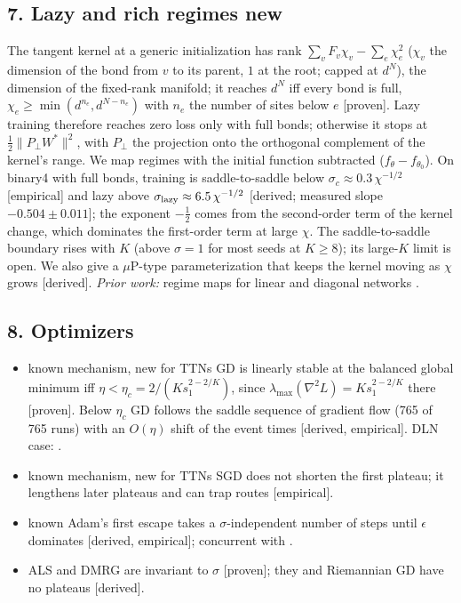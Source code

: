 \documentclass[11pt]{article}
\newcommand{\NEW}{\colorbox{ForestGreen!22}{\textsf{\small new}}}
\newcommand{\TTN}{\colorbox{Goldenrod!30}{\textsf{\small known mechanism, new for TTNs}}}
\newcommand{\KNOWN}{\colorbox{gray!22}{\textsf{\small known}}}
\newcommand{\ev}[1]{\textsf{\small[#1]}}
\begin{document}
\subsection*{7. Lazy and rich regimes \hfill\NEW}
The tangent kernel at a generic initialization has rank
$\sum_vF_v\chi_v-\sum_e\chi_e^2$ ($\chi_v$ the dimension of the bond from $v$ to its parent, $1$ at the root; capped at $d^N$), the dimension of the fixed-rank manifold; it reaches $d^N$
iff every bond is full, $\chi_e\ge\min(d^{n_e},d^{N-n_e})$ with $n_e$ the number of sites below $e$
\ev{proven}. Lazy training therefore reaches zero loss only with full bonds; otherwise it stops at
$\tfrac12\lVert P_\perp W^*\rVert^2$, with $P_\perp$ the projection onto the orthogonal complement of the kernel's range. We map regimes with the initial function subtracted
($f_\theta-f_{\theta_0}$). On binary4 with full bonds, training is saddle-to-saddle below
$\sigma_c\approx0.3\,\chi^{-1/2}$ \ev{empirical} and lazy above $\sigma_{\rm lazy}\approx6.5\,\chi^{-1/2}$
\ev{derived; measured slope $-0.504\pm0.011$}; the exponent $-\tfrac12$ comes from the second-order term of the kernel change, which dominates the
first-order term at large $\chi$. The saddle-to-saddle boundary rises with $K$ (above $\sigma=1$ for most seeds at $K\ge8$); its
large-$K$ limit is open. We also give a $\mu$P-type parameterization that keeps the kernel moving as $\chi$
grows \ev{derived}.
\emph{Prior work:} regime maps for linear and diagonal networks \citep{woodworth2020kernel,kunin2024get}.

\subsection*{8. Optimizers}
\begin{itemize}[leftmargin=*]
\item \TTN{} GD is linearly stable at the balanced global minimum iff
$\eta<\eta_c=2/(K s_1^{2-2/K})$, since $\lambda_{\max}(\nabla^2L)=Ks_1^{2-2/K}$ there \ev{proven}. Below
$\eta_c$ GD follows the saddle sequence of gradient flow (765 of 765 runs) with an $O(\eta)$ shift of the
event times \ev{derived, empirical}. DLN case: \citet{mulayoff2020unique}.
\item \TTN{} SGD does not shorten the first plateau; it lengthens later plateaus and can trap routes
\ev{empirical}.
\item \KNOWN{} Adam's first escape takes a $\sigma$-independent number of steps until $\epsilon$ dominates
\ev{derived, empirical}; concurrent with \citet{sabanayagam2026optimizer}.
\item ALS and DMRG are invariant to $\sigma$ \ev{proven}; they and Riemannian GD have no plateaus \ev{derived}.
\end{itemize}
\end{document}
